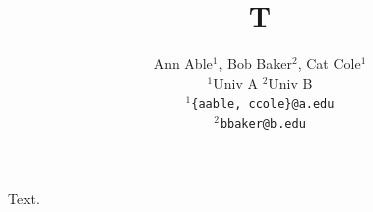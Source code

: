 \documentclass{article}
\title{T}
\author{Ann Able$^1$, Bob Baker$^2$, Cat Cole$^1$ \\
$^1$Univ A \quad $^2$Univ B \\
{\tt $^1$\{aable, ccole\}@a.edu} \\
{\tt $^2$bbaker@b.edu}}
\begin{document}
\maketitle
Text.
\end{document}
